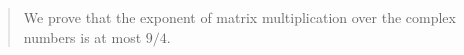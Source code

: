 

\maketitle
\begin{abstract}
We prove that the exponent of matrix multiplication over the complex numbers is at most $9/4$.
\end{abstract}








